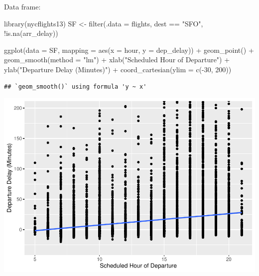 \documentclass[
]{article}
\newenvironment{Shaded}{\begin{snugshade}}{\end{snugshade}}
\newcommand{\AttributeTok}[1]{\textcolor[rgb]{0.77,0.63,0.00}{#1}}
\newcommand{\DecValTok}[1]{\textcolor[rgb]{0.00,0.00,0.81}{#1}}
\newcommand{\FunctionTok}[1]{\textcolor[rgb]{0.00,0.00,0.00}{#1}}
\newcommand{\NormalTok}[1]{#1}
\newcommand{\OtherTok}[1]{\textcolor[rgb]{0.56,0.35,0.01}{#1}}
\newcommand{\SpecialCharTok}[1]{\textcolor[rgb]{0.00,0.00,0.00}{#1}}
\newcommand{\StringTok}[1]{\textcolor[rgb]{0.31,0.60,0.02}{#1}}
\begin{document}
\hfill\break
Data frame:

\begin{Shaded}
\begin{Highlighting}[]
\FunctionTok{library}\NormalTok{(nycflights13)}
\NormalTok{SF }\OtherTok{\textless{}{-}} \FunctionTok{filter}\NormalTok{(}\AttributeTok{.data =}\NormalTok{ flights, dest }\SpecialCharTok{==} \StringTok{"SFO"}\NormalTok{, }\SpecialCharTok{!}\FunctionTok{is.na}\NormalTok{(arr\_delay))}

\FunctionTok{ggplot}\NormalTok{(}\AttributeTok{data =}\NormalTok{ SF, }\AttributeTok{mapping =} \FunctionTok{aes}\NormalTok{(}\AttributeTok{x =}\NormalTok{ hour, }\AttributeTok{y =}\NormalTok{ dep\_delay)) }\SpecialCharTok{+}
  \FunctionTok{geom\_point}\NormalTok{() }\SpecialCharTok{+}
  \FunctionTok{geom\_smooth}\NormalTok{(}\AttributeTok{method =} \StringTok{"lm"}\NormalTok{) }\SpecialCharTok{+}
  \FunctionTok{xlab}\NormalTok{(}\StringTok{"Scheduled Hour of Departure"}\NormalTok{) }\SpecialCharTok{+}     \FunctionTok{ylab}\NormalTok{(}\StringTok{"Departure Delay (Minutes)"}\NormalTok{) }\SpecialCharTok{+}
  \FunctionTok{coord\_cartesian}\NormalTok{(}\AttributeTok{ylim =} \FunctionTok{c}\NormalTok{(}\SpecialCharTok{{-}}\DecValTok{30}\NormalTok{, }\DecValTok{200}\NormalTok{))}
\end{Highlighting}
\end{Shaded}

\begin{verbatim}
## `geom_smooth()` using formula 'y ~ x'
\end{verbatim}

\includegraphics{Class_Exercises_ClassNotes_5_files/figure-latex/unnamed-chunk-22-1.pdf}
\newpage
\end{document}

